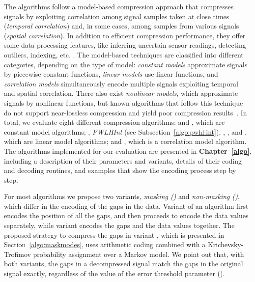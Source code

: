 The algorithms follow a model-based compression approach that compresses signals by exploiting correlation among signal samples taken at close times (\textit{temporal correlation}) and, in some cases, among samples from various signals (\textit{spatial correlation}). In addition to efficient compression performance, they offer some data processing features, like inferring uncertain sensor readings, detecting outliers, indexing, etc. \cite{AnEva2013}. The model-based techniques are classified into different categories, depending on the type of model: \textit{constant models} approximate signals by piecewise constant functions, \textit{linear models} use linear functions, and \textit{correlation models} simultaneously encode multiple signals exploiting temporal and spatial correlation. There also exist \textit{nonlinear models}, which approximate signals by nonlinear functions, but known algorithms that follow this technique do not support near-lossless compression and yield poor compression results~\cite{AnEva2013}. In total, we evaluate eight different compression algorithms: \textit{\PCAfull} \cite{coder:pca} and \textit{\APCAfull} \cite{coder:apca}, which are constant model algorithms; \textit{\PWLHfull} \cite{coder:pwlh}, \textit{PWLHInt} (see Subsection~\ref{algo:pwhl:int}), \textit{\CAfull} \cite{coder:ca}, \textit{\SFfull} \cite{coder:sf}, and \textit{\FRfull} \cite{coder:fr}, which are linear model algorithms; and \textit{\GAMPSfull} \cite{coder:gamps}, which is a correlation model algorithm. The algorithms implemented for our evaluation are presented in \textbf{Chapter~\ref{algo}}, including a description of their parameters and variants, details of their coding and decoding routines, and examples that show the encoding process step by step.


For most algorithms we propose two variants, \textit{masking (\maskalgo)} and \textit{non-masking (\NOmaskalgo)}, which differ in the encoding of the gaps in the data. Variant \maskalgo of an algorithm first encodes the position of all the gaps, and then proceeds to encode the data values separately, while variant \NOmaskalgo encodes the gaps and the data values together. The proposed strategy to compress the gaps in variant \maskalgo, which is presented in Section~\ref{algo:maskmodes}, uses arithmetic coding \cite{ac2, Cover2005} combined with a Krichevsky-Trofimov probability assignment \cite{ktestimator} over a Markov model. We point out that, with both variants, the gaps in a decompressed signal match the gaps in the original signal exactly, regardless of the value of the error threshold parameter (\maxerror).  


